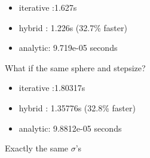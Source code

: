 \documentclass{beamer}
\begin{document}
\begin{frame}
	\begin{itemize}
		\item iterative :1.627s
		\item hybrid : 1.226s (32.7\% faster)
		\item analytic: 9.719e-05 seconds
	\end{itemize}
\end{frame}
\begin{frame}{What if the same sphere and stepsize?}
	\begin{itemize}
		\item iterative :1.80317s
		\item hybrid : 1.35776s (32.8\% faster)
		\item analytic: 9.8812e-05 seconds
	\end{itemize}\vspace{2cm}
	Exactly the same $\sigma$'s
\end{frame}
\end{document}
